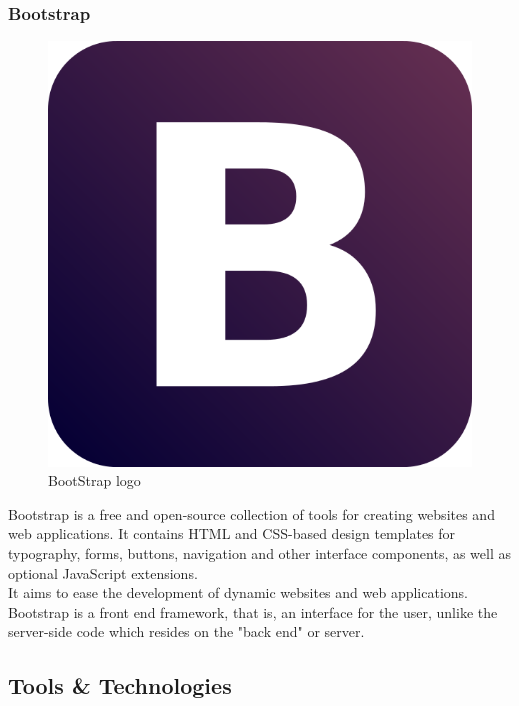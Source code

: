 \subsubsection{Bootstrap}
\begin{figure}[h!]
\centering \includegraphics[scale=0.2]{input/images/boot.png}
\caption{BootStrap logo}
\end{figure}

Bootstrap is a free and open-source collection of tools for creating websites and web applications. It contains HTML and CSS-based design templates for typography, forms, buttons, navigation and other interface components, as well as optional JavaScript extensions. \\
It aims to ease the development of dynamic websites and web applications.\\
Bootstrap is a front end framework, that is, an interface for the user, unlike the server-side code which resides on the "back end" or server.

\subsection{Tools \& Technologies}

